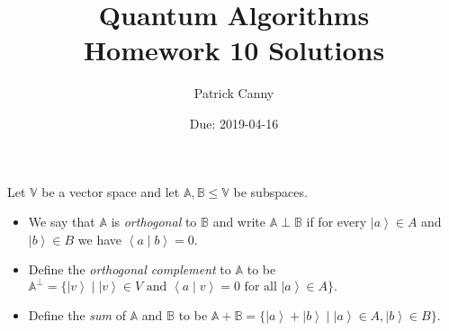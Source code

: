 \documentclass{exam} %
\newcommand{\m}[1]{\mathbb{#1}}    %
\theoremstyle{plain}
\theoremstyle{definition}
\theoremstyle{remark}
\newcommand{\ds}[1]{ \displaystyle{#1} }
\numberwithin{equation}{section}  %
\newcommand{\ket}[1]{ \left| #1 \right> }
\newcommand{\bracket}[2]{ \left< #1 \mid #2 \right> }
\begin{document}
\printanswers
\title{Quantum Algorithms \\ Homework 10 Solutions}
\author{Patrick Canny}
\date{Due: 2019-04-16}
\maketitle
\thispagestyle{foot}
\begin{defn*}
Let $\m{V}$ be a vector space and let $\m{A}, \m{B}\leq \m{V}$ be subspaces.
\begin{itemize}
  \item We say that $\m{A}$ is \emph{orthogonal} to $\m{B}$ and write $\m{A}
    \perp \m{B}$ if for every $\ket{a}\in A$ and $\ket{b}\in B$ we have
    $\bracket{a}{b} = 0$.
  \item Define the \emph{orthogonal complement} to $\m{A}$ to be
    $\ds{
      \m{A}^{\perp}
      = \Big\{ \ket{v} \mid \ket{v}\in V \text{ and } 
        \bracket{a}{v} = 0 \text{ for all } \ket{a}\in A \Big\}.
    }$
  \item Define the \emph{sum} of $\m{A}$ and $\m{B}$ to be
    $\ds{
      \m{A} + \m{B}
      = \Big\{ \ket{a} + \ket{b} \mid \ket{a}\in A, \ket{b}\in B \Big\}.
    }$
\end{itemize}
\end{defn*}
\end{document}

